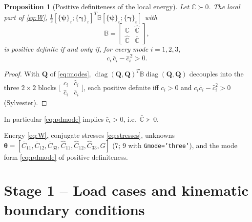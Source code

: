 \documentclass[11pt,a4paper]{article}
\newcommand{\C}{\mathbb{C}}                     %
\newcommand{\Cb}{\bar{\mathbb{C}}}              %
\newcommand{\Ch}{\hat{\mathbb{C}}}              %
\newcommand{\B}{\mathbb{B}}                     %
\newcommand{\bpsi}{\bm{\psi}}
\newcommand{\bgam}{\bm{\gamma}}
\newcommand{\bth}{\bm{\theta}}
\newcommand{\ve}[1]{\{#1\}_{\varepsilon}}      %
\newcommand{\code}[1]{\texttt{#1}}
\theoremstyle{plain}
\newtheorem{proposition}{Proposition}
\theoremstyle{remark}
\begin{document}
\begin{proposition}[Positive definiteness of the local energy]
\label{prop:pd}
Let $\C\succ0$. The local part of \eqref{eq:W},
$\tfrac12[\ve{\bpsi};\ve{\bgam}]^T\B[\ve{\bpsi};\ve{\bgam}]$ with
\begin{equation}
  \B=\begin{bmatrix}\C&\Ch\\\Ch&\Cb\end{bmatrix},
  \label{eq:block}
\end{equation}
is positive definite if and only if, for every mode $i=1,2,3$,
\begin{equation}
  c_i\,\bar c_i-\hat c_i^{\,2}>0 .
  \label{eq:pdmode}
\end{equation}
\end{proposition}
\begin{proof}
With $\bm Q$ of \eqref{eq:modes}, $\operatorname{diag}(\bm Q,\bm Q)^T\B\operatorname{diag}(\bm Q,\bm Q)$
decouples into the three $2\times2$ blocks
$\big[\begin{smallmatrix}c_i&\hat c_i\\\hat c_i&\bar c_i\end{smallmatrix}\big]$, each positive
definite iff $c_i>0$ and $c_i\bar c_i-\hat c_i^2>0$ (Sylvester).
\end{proof}
\noindent In particular \eqref{eq:pdmode} implies $\bar c_i>0$, i.e.\ $\Cb\succ0$.
\begin{delivers}
Energy \eqref{eq:W}, conjugate stresses \eqref{eq:stresses}, unknowns
$\bth=[\bar C_{11},\bar C_{12},\bar C_{33},\hat C_{11},\hat C_{12},\hat C_{33},G]$ (7; 9 with
\code{Gmode='three'}), and the mode form \eqref{eq:pdmode} of positive definiteness.
\end{delivers}

\section{Stage 1 -- Load cases and kinematic boundary conditions}
\label{sec:stage1}
\end{document}

